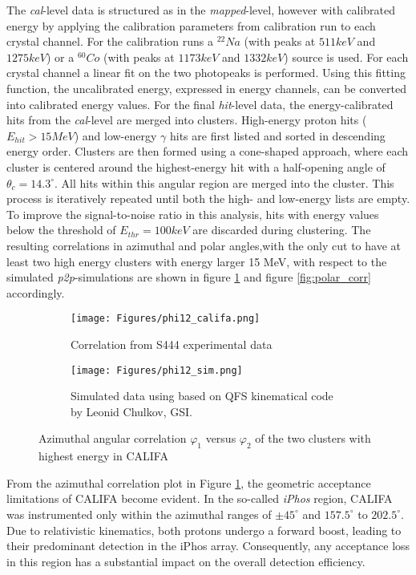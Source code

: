 The \textit{cal}-level data is structured as in the \textit{mapped}-level, however with calibrated energy by applying the calibration parameters from calibration run to each crystal channel.\newline
For the calibration runs a $^{22}Na$ (with peaks at $511keV$ and $1275keV$) or a $^{60}Co$ (with peaks at $1173keV$ and $1332keV$) source is used. For each crystal channel a linear fit on the two photopeaks is performed. Using this fitting function, the uncalibrated energy, expressed in energy channels, can be converted into calibrated energy values.\newline
For the final \textit{hit}-level data, the energy-calibrated hits from the \textit{cal}-level are merged into clusters. High-energy proton hits ($E_{hit} > 15 MeV$) and low-energy $\gamma$ hits are first listed and sorted in descending energy order. Clusters are then formed using a cone-shaped approach, where each cluster is centered around the highest-energy hit with a half-opening angle of $\theta_c = 14.3^{\circ}$. All hits within this angular region are merged into the cluster. This process is iteratively repeated until both the high- and low-energy lists are empty. To improve the signal-to-noise ratio in this analysis, hits with energy values below the threshold of $E_{thr} = 100keV$ are discarded during clustering.\newline
The resulting correlations in azimuthal and polar angles,with the only cut to have at least two high energy clusters with energy larger 15 MeV, with respect to the simulated \textit{p2p}-simulations are shown in figure \ref{fig:azimuth_corr} and figure \ref{fig:polar_corr} accordingly.\newline
\begin{figure}[htpb]
	\begin{subfigure}[t]{.75\linewidth}
    \texttt{[image: Figures/phi12\_califa.png]}
	\caption{Correlation from S444 experimental data}
	\end{subfigure}
	\begin{subfigure}[t]{.75\linewidth}
    \texttt{[image: Figures/phi12\_sim.png]}
	\caption{Simulated data using based on QFS kinematical code by Leonid Chulkov, GSI.}
	\end{subfigure}
    \caption{Azimuthal angular correlation $\varphi_1$ versus $\varphi_2$ of the two clusters with highest energy in CALIFA }
    \label{fig:azimuth_corr}
\end{figure}
From the azimuthal correlation plot in Figure \ref{fig:azimuth_corr}, the geometric acceptance limitations of CALIFA become evident. In the so-called \textit{iPhos} region, CALIFA was instrumented only within the azimuthal ranges of $\pm 45^{\circ}$ and $157.5^{\circ}$ to $202.5^{\circ}$. Due to relativistic kinematics, both protons undergo a forward boost, leading to their predominant detection in the iPhos array. Consequently, any acceptance loss in this region has a substantial impact on the overall detection efficiency.\newline
